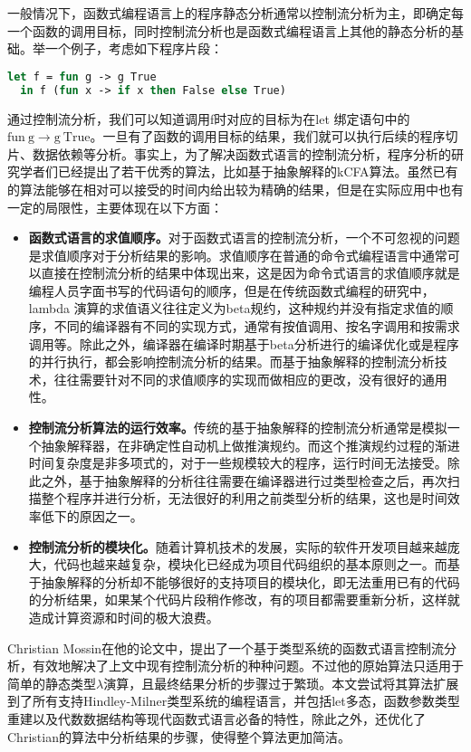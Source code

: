 \documentclass[12pt, titlepage]{article}
\begin{document}
	一般情况下，函数式编程语言上的程序静态分析通常以控制流分析为主，即确定每一个函数的调用目标，同时控制流分析也是函数式编程语言上其他的静态分析的基础。举一个例子，考虑如下程序片段：
	\begin{lstlisting}[language=Ocaml]
  let f = fun g -> g True
  in f (fun x -> if x then False else True)
	\end{lstlisting}
	通过控制流分析，我们可以知道调用f时对应的目标为在let 绑定语句中的$\mathrm{fun}\ \mathrm{g} \to \mathrm{g}\ \mathrm{True}$。一旦有了函数的调用目标的结果，我们就可以执行后续的程序切片、数据依赖等分析。事实上，为了解决函数式语言的控制流分析，程序分析的研究学者们已经提出了若干优秀的算法，比如基于抽象解释的kCFA算法。虽然已有的算法能够在相对可以接受的时间内给出较为精确的结果，但是在实际应用中也有一定的局限性，主要体现在以下方面：
	\begin{itemize}
		\item \textbf{函数式语言的求值顺序。}对于函数式语言的控制流分析，一个不可忽视的问题是求值顺序对于分析结果的影响。求值顺序在普通的命令式编程语言中通常可以直接在控制流分析的结果中体现出来，这是因为命令式语言的求值顺序就是编程人员字面书写的代码语句的顺序，但是在传统函数式编程的研究中，lambda 演算的求值语义往往定义为beta规约，这种规约并没有指定求值的顺序，不同的编译器有不同的实现方式，通常有按值调用、按名字调用和按需求调用等。除此之外，编译器在编译时期基于beta分析进行的编译优化或是程序的并行执行，都会影响控制流分析的结果。而基于抽象解释的控制流分析技术，往往需要针对不同的求值顺序的实现而做相应的更改，没有很好的通用性。
		\item \textbf{控制流分析算法的运行效率。}传统的基于抽象解释的控制流分析通常是模拟一个抽象解释器，在非确定性自动机上做推演规约。而这个推演规约过程的渐进时间复杂度是非多项式的，对于一些规模较大的程序，运行时间无法接受。除此之外，基于抽象解释的分析往往需要在编译器进行过类型检查之后，再次扫描整个程序并进行分析，无法很好的利用之前类型分析的结果，这也是时间效率低下的原因之一。
		\item \textbf{控制流分析的模块化。}随着计算机技术的发展，实际的软件开发项目越来越庞大，代码也越来越复杂，模块化已经成为项目代码组织的基本原则之一。而基于抽象解释的分析却不能够很好的支持项目的模块化，即无法重用已有的代码的分析结果，如果某个代码片段稍作修改，有的项目都需要重新分析，这样就造成计算资源和时间的极大浪费。
	\end{itemize}
	Christian Mossin在他的论文中\cite{fp}，提出了一个基于类型系统的函数式语言控制流分析，有效地解决了上文中现有控制流分析的种种问题。不过他的原始算法只适用于简单的静态类型$\lambda$演算，且最终结果分析的步骤过于繁琐。本文尝试将其算法扩展到了所有支持Hindley-Milner类型系统的编程语言，并包括let多态，函数参数类型重建以及代数数据结构等现代函数式语言必备的特性，除此之外，还优化了Christian的算法中分析结果的步骤，使得整个算法更加简洁。
	
\end{document}
